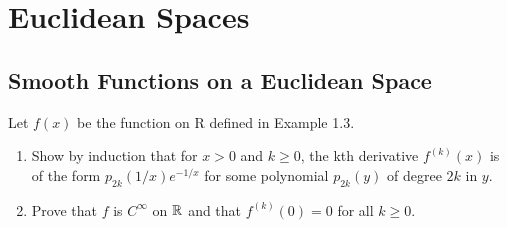 \section{Euclidean Spaces}

\subsection{Smooth Functions on a Euclidean Space}

\begin{exercise}{1.2}
Let $f(x)$ be the function on R defined in Example 1.3.
\begin{enumerate}[label=(\alph*)]
    \item Show by induction that for $x > 0$ and $k \geq 0$, the kth derivative $f^{(k)}(x)$ is of the form
    $p_{2k}(1/x)e^{-1/x}$ for some polynomial $p_{2k}(y)$ of degree $2k$ in $y$.
    \item Prove that $f$ is $C^\infty$ on $\mathbb{R}$ and that $f^{(k)}(0)=0$ for all $k \geq 0$.
\end{enumerate}
\end{exercise}


